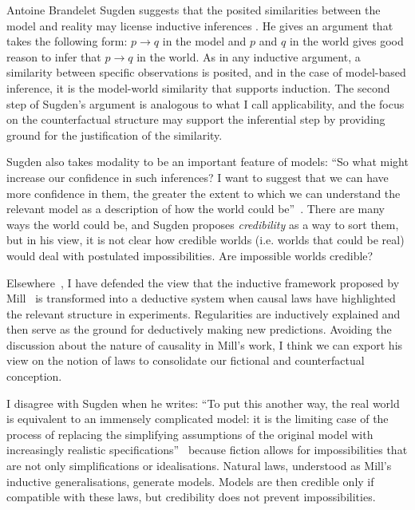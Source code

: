 \begin{artengenv}{Antoine Brandelet}
Sugden suggests that the posited similarities between the model and reality may license inductive inferences \parencites[see e.g.][]{Sugden2000}[p.240]{Sugden2013}. He gives an argument that takes the following form: $p\rightarrow q$ in the model and $p$ and $q$ in the world gives good reason to infer that $p\rightarrow q$ in the world. As in any inductive argument, a similarity between specific observations is posited, and in the case of model-based inference, it is the model-world similarity that supports induction. The second step of Sugden's argument is analogous to what I call applicability, and the focus on the counterfactual structure may support the inferential step by providing ground for the justification of the similarity.

Sugden also takes modality to be an important feature of models: ``So what might increase our confidence in such inferences? I want to suggest that we can have more confidence in them, the greater the extent to which we can understand the relevant model as a description of how the world could be''~\parencite[p.24]{Sugden2000}. There are many ways the world could be, and Sugden proposes \textit{credibility} as a way to sort them, but in his view, it is not clear how credible worlds (i.e. worlds that could be real) would deal with postulated impossibilities. Are impossible worlds credible?

Elsewhere~\parencite{author2021}, I have defended the view that the inductive framework proposed by Mill~\parencite{Mill1843eng} is transformed into a deductive system when causal laws have highlighted the relevant structure in experiments. Regularities are inductively explained and then serve as the ground for deductively making new predictions. Avoiding the discussion about the nature of causality in Mill's work, I think we can export his view on the notion of laws to consolidate our fictional and counterfactual conception.

I disagree with Sugden when he writes: ``To put this another way, the real world is equivalent to an immensely complicated model: it is the limiting case of the process of replacing the simplifying assumptions of the original model with increasingly realistic specifications''~\parencite[p.~23]{Sugden2000} because fiction allows for impossibilities that are not only simplifications or idealisations. Natural laws, understood as Mill's inductive generalisations, generate models. Models are then credible only if compatible with these laws, but credibility does not prevent impossibilities.


\end{artengenv}

